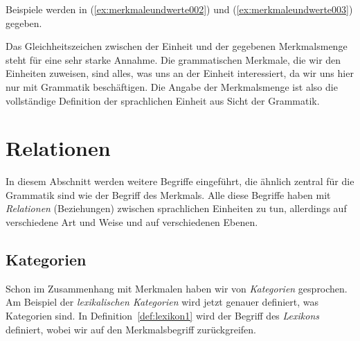\Np

Beispiele werden in (\ref{ex:merkmaleundwerte002}) und (\ref{ex:merkmaleundwerte003}) gegeben.

\begin{exe}
  \ex\label{ex:merkmaleundwerte003}
  \begin{xlist}
  \end{xlist}
\end{exe}

Das Gleichheitszeichen zwischen der Einheit und der gegebenen Merkmalsmenge steht für eine sehr starke Annahme.
Die grammatischen Merkmale, die wir den Einheiten zuweisen, sind alles, was uns an der Einheit interessiert, da wir uns hier nur mit Grammatik beschäftigen.
Die Angabe der Merkmalsmenge ist also die vollständige Definition der sprachlichen Einheit aus Sicht der Grammatik.


\section{Relationen}
\label{sec:relationen}

In diesem Abschnitt werden weitere Begriffe eingeführt, die ähnlich zentral für die Grammatik sind wie der Begriff des Merkmals.
Alle diese Begriffe haben mit \textit{Relationen} (Beziehungen) zwischen sprachlichen Einheiten zu tun, allerdings auf verschiedene Art und Weise und auf verschiedenen Ebenen.

\subsection{Kategorien}
\label{sec:kategorien}


Schon im Zusammenhang mit Merkmalen haben wir von \textit{Kategorien} gesprochen.
Am Beispiel der \textit{lexikalischen Kategorien} wird jetzt genauer definiert, was Kategorien sind.
In Definition~\ref{def:lexikon1} wird der Begriff des \textit{Lexikons} definiert, wobei wir auf den Merkmalsbegriff zurückgreifen.


